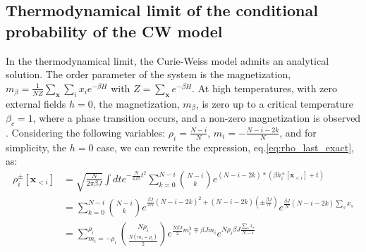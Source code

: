 \documentclass[10pt, notitlepage]{revtex4-2}
\begin{document}
\subsection{Thermodynamical limit of the conditional probability of the CW model}
In the thermodynamical limit, the Curie-Weiss model admits an analytical solution. The order parameter of the system is the magnetization, $m_{\beta}=\frac{1}{N Z}\sum_{\mathbf{x}}\sum_i x_i e^{-\beta H}$ with $Z = \sum_{\mathbf{x}} e^{-\beta H}$. At high temperatures, with zero external fields $h=0$, the magnetization, $m_{\beta}$, is zero up to a critical temperature $\beta_c=1$, where a phase transition occurs, and a non-zero magnetization is observed \cite{kadanoff2000statistical}. Considering the following variables: $\rho_i = \frac{N-i}{N}$, $m_i = -\frac{N-i-2k}{N}$, and for simplicity, the $h=0$ case, we can rewrite the expression, eq.\ref{eq:rho_last_exact}, as:
\begin{align}
    \rho_i^{\pm}[\mathbf{x}_{<i}] &= \sqrt{\frac{N}{2\pi \beta J}}\int dt e^{-\frac{N}{2J \beta}t^{2}} 
    \sum_{k=0}^{N-i} \binom{N-i}{k} e^{(N-i-2k)*(\beta h_i^{\pm}[\mathbf{x}_{<i}] + t)}\\ \label{eq:rho_last_exact2} &= \sum_{k=0}^{N-i} \binom{N-i}{k}e^{\frac{\beta J}{2N}\left(N-i-2k\right)^{2}+\left(N-i-2k\right)\left(\pm\frac{\beta J}{N}\right)} e^{\frac{\beta J}{N}\left(N-i-2k\right) \sum_s x_s}  \\
    &= \sum_{m_i=-\rho_i}^{\rho_i} \binom{N\rho_i}{\frac{N(m_i+\rho_i)}{2}} e^{\frac{N \beta J}{2}m_i^{2} \mp \beta J m_i } e^{N \rho_i \beta J \frac{\sum_s x_s}{N-i}}
\end{align}    
\end{document}
